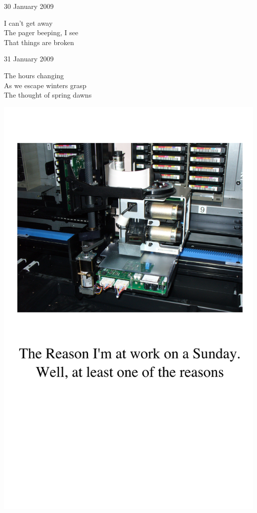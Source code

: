 \documentclass[12pt]{article}
\begin{document}
30 January 2009

I can't get away \\
The pager beeping, I see \\
That things are broken

31 January 2009

The hours changing \\
As we escape winters grasp \\
The thought of spring dawns

\newpage

\includegraphics{back.png}

\newpage
\end{document}

